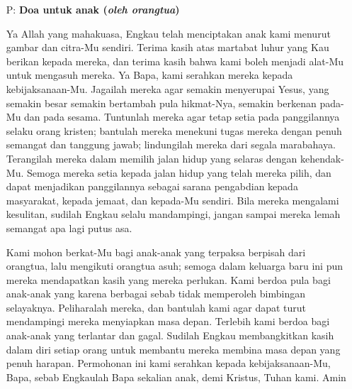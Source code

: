 \documentclass[a5paper,12pt,openany]{scrbook}
\newcommand{\BP}[1]{\begin{itemize} \item[P:] #1 \end{itemize}}
\begin{document}
\normalsize

\BP{\textbf{Doa untuk anak (\textit{oleh orangtua})}

Ya Allah yang mahakuasa, Engkau telah menciptakan anak kami menurut gambar dan citra-Mu sendiri. Terima kasih atas martabat luhur yang Kau berikan kepada mereka, dan terima kasih bahwa kami boleh menjadi alat-Mu untuk mengasuh mereka. Ya Bapa, kami serahkan mereka kepada kebijaksanaan-Mu. Jagailah mereka agar semakin menyerupai Yesus, yang semakin besar semakin bertambah pula hikmat-Nya, semakin berkenan pada-Mu dan pada sesama. Tuntunlah mereka agar tetap setia pada panggilannya selaku orang kristen; bantulah mereka menekuni tugas mereka dengan penuh semangat dan tanggung jawab; lindungilah mereka dari segala marabahaya. Terangilah mereka dalam memilih jalan hidup yang selaras dengan kehendak-Mu. Semoga mereka setia kepada jalan hidup yang telah mereka pilih, dan dapat menjadikan panggilannya sebagai sarana pengabdian kepada masyarakat, kepada jemaat, dan kepada-Mu sendiri. Bila mereka mengalami kesulitan, sudilah Engkau selalu mandampingi, jangan sampai mereka lemah semangat apa lagi putus asa.

Kami mohon berkat-Mu bagi anak-anak yang terpaksa berpisah dari orangtua, lalu mengikuti orangtua asuh; semoga dalam keluarga baru ini pun mereka mendapatkan kasih yang mereka perlukan. Kami berdoa pula bagi anak-anak yang karena berbagai sebab tidak memperoleh bimbingan selayaknya. Peliharalah mereka, dan bantulah kami agar dapat turut mendampingi mereka menyiapkan masa depan.
Terlebih kami berdoa bagi anak-anak yang terlantar dan gagal. Sudilah Engkau membangkitkan kasih dalam diri setiap orang untuk membantu mereka membina masa depan yang penuh harapan.
Permohonan ini kami serahkan kepada kebijaksanaan-Mu, Bapa, sebab Engkaulah Bapa sekalian anak, demi Kristus, Tuhan kami. Amin}
\end{document}
